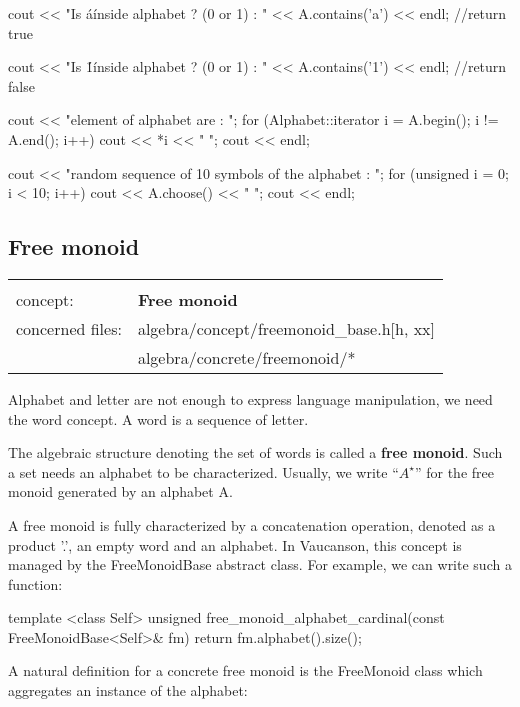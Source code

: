 \documentclass{article}
\begin{document}
\begin{code}
\begin{code}
  cout << "Is \'a\' inside alphabet ? (0 or 1) : "
       << A.contains('a') << endl;         //return true

  cout << "Is \'1\' inside alphabet ? (0 or 1) : "
       << A.contains('1') << endl;         //return false
  
  cout << "element of alphabet are : ";
  for (Alphabet::iterator i = A.begin(); i != A.end(); i++)
    cout << *i << " ";
  cout << endl;
  
  cout << "random sequence of 10 symbols of the alphabet : ";
  for (unsigned i = 0; i < 10; i++)
    cout << A.choose() << " ";
  cout << endl;
\end{code}

\subsection{Free monoid}

\begin{tabular}%
{ll}
\hline \\
concept: & \textbf{Free monoid}  \\
concerned files: & algebra/concept/freemonoid\_base.h[h, xx] \\
                 & algebra/concrete/freemonoid/* \\
\hline 
\end{tabular}

\hspace{1cm}

Alphabet and letter are not enough to express language manipulation,
we need the word concept. A word is a sequence of letter. 

The algebraic structure denoting the set of words is called a
\textbf{free monoid}. Such a set needs an alphabet to be
characterized. Usually, we write ``$A^{\star}$'' for the free monoid
generated by an alphabet A.

A free monoid is fully characterized by a concatenation operation,
denoted as a product '.', an empty word and an alphabet. In Vaucanson,
this concept is managed by the FreeMonoidBase abstract class. For
example, we can write such a function:

\begin{code}
template <class Self>
unsigned free_monoid_alphabet_cardinal(const FreeMonoidBase<Self>& fm)
{
  return fm.alphabet().size();
}
\end{code}

A natural definition for a concrete free monoid is the FreeMonoid
class which aggregates an instance of the alphabet:


\end{code}
\end{document}
